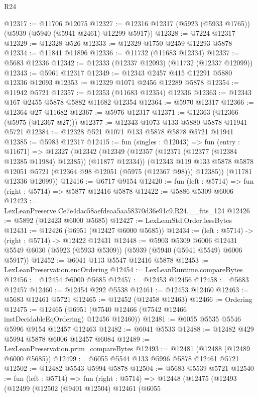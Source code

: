 \begin{lexlean}{R24}
\begin{coremodule}
@12317 := @11706 @12075
@12327 := @12316 @12317 (@5923 (@5933 @1765)) (@5939 (@5940 (@5941 @2461) @12299 @5917))
@12328 := @7224 @12317
@12329 := @12328 @526
@12333 := @12329 @1750 @2459 @12293 @5878
@12334 := @11841 @11896
@12336 := @11732 (@11683 @12334)
@12337 := @5683 @12336
@12342 := @12333 (@12337 @12093) (@11732 (@12337 @12099))
@12343 := @5961 @12317
@12349 := @12343 @2457 @415 @12291 @5880 @12336 @12093
@12353 := @12329 @1071 @2456 @12289 @5878
@12354 := @11942 @5721
@12357 := @12353 (@11683 @12354) @12336
@12363 := @12343 @167 @2455 @5878 @5882 @11682 @12354
@12364 := @5970 @12317
@12366 := @12364 @27 @11682
@12367 := @5976 @12317
@12371 := @12363 (@12366 (@5975 (@12367 @27)))
@12377 := @12343 @1073 @133 @5880 @5878 @11941 @5721
@12384 := @12328 @521 @1071 @133 @5878 @5878 @5721 @11941
@12385 := @5983 @12317
@12415 := fun (singles : @12043) =>
  fun (entry : @11671) =>
  @12327
    (@12342
      (@12349
        (@12357 (@12371 (@12377 (@12384 @12385 @11984) @12385)) (@11877 @12334))
        (@12343 @119 @133 @5878 @5878 @12051 @5721 (@12364 @98 @12051 (@5975 (@12367 @98))) @12385))
      (@11781 @12336 @12099))
@12416 := @6717 @9154
@12420 := fun (left : @5714) => fun (right : @5714) => @5877 @12416 @5878
@12422 := @5886 @5309 @6006
@12423 := LexLeanPreserve.Ce7e4dac58aefdeaa5aa58370d36e91c9.R24.__fits_124
@12426 := @5892 (@12423 @6000 @5685)
@12427 := LexLeanStd.Order.lessBytes
@12431 := @12426 (@6951 (@12427 @6000 @5685))
@12434 := (left : @5714) -> (right : @5714) -> @12422 @12431
@12448 := @5903
    @5309
    @6006
    @12431
    @5549
    @6030
    (@5923 (@5933 @5309))
    (@5939 (@5940 (@5941 @5549) @6006 @5917))
@12452 := @6041 @113 @5547 @12416 @5878
@12453 := LexLeanPreservation.encOrdering
@12454 := LexLeanRuntime.compareBytes
@12456 := @12454 @6000 @5685
@12457 := @12453 @12456
@12458 := @5683 @12457
@12460 := @12454 @292 @5538
@12461 := @12453 @12460
@12463 := @5683 @12461 @5721
@12465 := @12452 (@12458 @12463)
@12466 := Ordering
@12475 := @12465 (@6951 (@7540 @12466 (@7542 @12466 instDecidableEqOrdering) @12456 @12460))
@12481 := @6055 @5535 @5546 @5996 @9154 @12457 @12463
@12482 := @6041 @5533
@12488 := @12482 @429 @5994 @5878 @6006 @12457 @6084
@12489 := LexLeanPreservation.prim_compareBytes
@12493 := @12481 (@12488 (@12489 @6000 @5685))
@12499 := @6055 @5544 @133 @5996 @5878 @12461 @5721
@12502 := @12482 @5543 @5994 @5878
@12504 := @5683 @5539 @5721
@12540 := fun (left : @5714) =>
  fun (right : @5714) =>
  @12448
    (@12475
      (@12493
        (@12499
          (@12502
            (@9401 @12504)
            @12461
            (@6055

\end{coremodule}
\end{lexlean}
